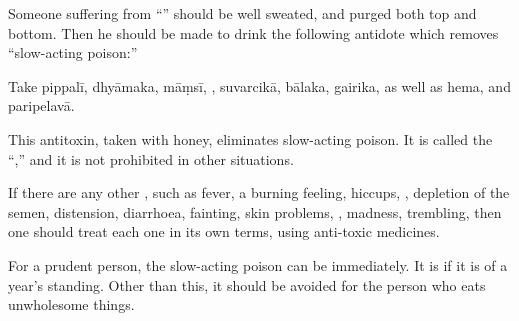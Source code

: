 \begin{translation}    
    
    \item[ 50--52]
    
Someone suffering from “” should be
well sweated, and purged both top and bottom.  Then he should be made
to drink the following  antidote which removes
“slow-acting poison:”
    
    Take
    \gls{pippalī},
    \gls{dhyāmaka},
    \gls{māṃsī},
,
\gls{suvarcikā},
\gls{bālaka}, 
\gls{gairika}, as well as \gls{hema},
and
\gls{paripelavā}.

This antitoxin, taken with honey, eliminates slow-acting poison. It is called the
“,” and it is not prohibited in other situations.
 
    \item[ 53--54]

If there are any other , such as fever, a
burning feeling, hiccups, , depletion of the
semen, distension, diarrhoea, fainting, skin problems,
, madness, trembling, then one should treat
each one in its own terms,  using anti-toxic medicines.
    
    \item[ 55] 
    
For a prudent person, the slow-acting poison can be
 immediately.  It is  if it is
of a year's standing. Other than this, it should be avoided for the
person who eats unwholesome things.

    \end{translation}


\endinput 
